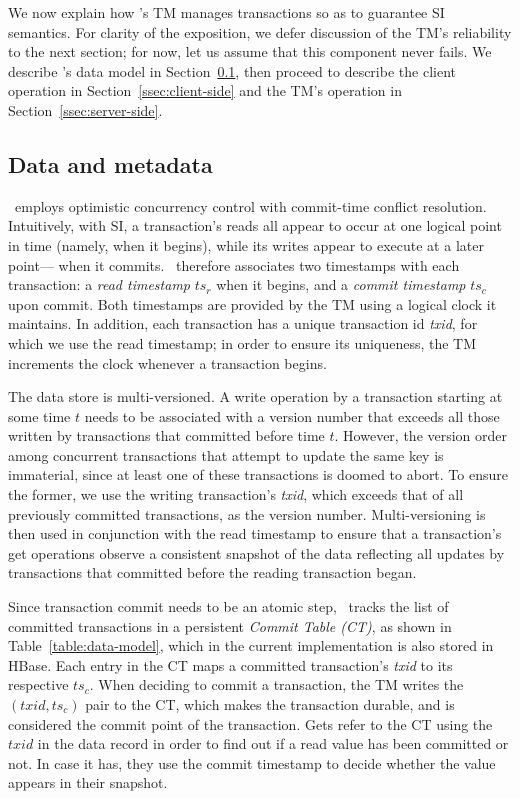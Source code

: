 

We now explain how \sys's TM manages transactions so as to guarantee  SI semantics. For clarity of the exposition, we defer discussion of the TM's reliability  to the next section; for now, let us assume that this component never fails. 
We describe \sys's data model in Section~\ref{ssec:data-model}, then proceed to describe the client operation in Section~\ref{ssec:client-side} and the TM's operation in Section~\ref{ssec:server-side}.

\subsection{Data and metadata}
\label{ssec:data-model}

\sys\ employs optimistic concurrency control with commit-time conflict resolution. Intuitively, with SI, a transaction's reads all appear to occur at one logical point in time (namely, when it begins), while its writes appear to execute at a later point--- when it commits. \sys\ therefore associates two timestamps with each transaction: a \emph{read timestamp} $ts_r$ when it begins, and a \emph{commit timestamp} $ts_c$ upon commit. Both timestamps are provided by the TM using a logical clock it maintains. In addition, each transaction has a unique transaction id \emph{txid}, 
for which we use the read timestamp; in order to ensure its uniqueness, the TM increments the clock whenever a transaction begins. 

The data store is multi-versioned. A write operation by a transaction starting at some time $t$ needs to be associated with a version number that exceeds all those written by transactions that committed before time $t$. However, the version order among concurrent transactions that  attempt to update the same key is immaterial, since at least one of these transactions is doomed to abort. To ensure the former, 
we use the writing transaction's \emph{txid}, which exceeds that of all previously committed transactions, as the version number. Multi-versioning is then used in conjunction with the read timestamp to ensure that a transaction's get operations observe a consistent snapshot of the data reflecting all updates by  transactions that committed before the reading transaction began. 

Since transaction commit needs to be an atomic step, \sys\ tracks the list of committed transactions in a persistent
 {\em Commit Table (CT)}, as shown in Table~\ref{table:data-model}, which in the current implementation is also stored in HBase.
Each entry in the CT maps a committed transaction's \emph{txid} to its respective $ts_c$.
When deciding to commit a transaction, the TM writes the $(txid, ts_c)$ pair to the CT, which makes the transaction durable, and is considered the commit point of the transaction.
Gets refer to the CT using the $txid$ in the data record in order to find out if a read value has been committed or not.
In case it has, they use the commit timestamp to decide whether the value appears in their snapshot.

